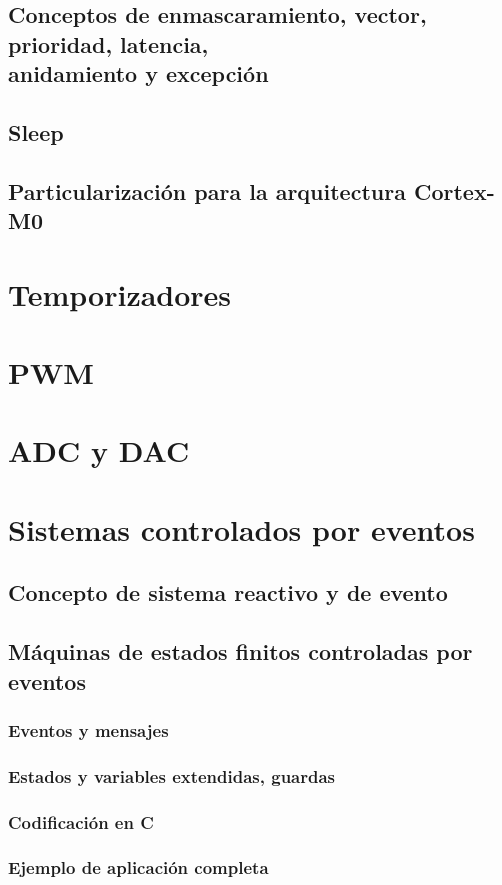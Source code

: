\documentclass[a4paper]{book}
\numberwithin{figure}{chapter}
\numberwithin{equation}{chapter}
\begin{document}
\subsection{\texorpdfstring{Conceptos de enmascaramiento, vector, prioridad, latencia,\\ anidamiento y excepción}{Conceptos de enmascaramiento, vector, prioridad, latencia, anidamiento y excepción}}
\subsection{Sleep}
\subsection{Particularización para la arquitectura Cortex-M0}
\section{Temporizadores}
\section{PWM}
\section{ADC y DAC}
\section{Sistemas controlados por eventos}
\subsection{Concepto de sistema reactivo y de evento}
\subsection{Máquinas de estados finitos controladas por eventos}
\subsubsection{Eventos y mensajes}
\subsubsection{Estados y variables extendidas, guardas}
\subsubsection{Codificación en C}
\subsubsection{Ejemplo de aplicación completa}
\end{document}
